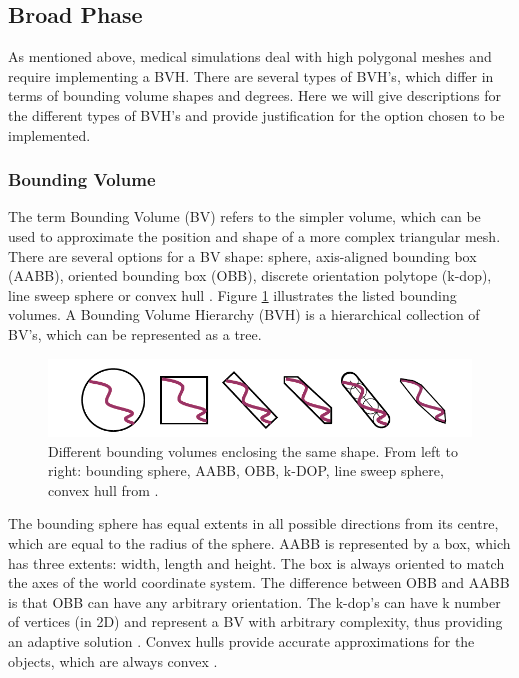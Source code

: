   \subsection{Broad Phase}
  As mentioned above, medical simulations deal with high polygonal meshes and require implementing a BVH. There are several types of BVH's, which differ in terms of bounding volume shapes and degrees. Here we will give descriptions for the different types of BVH's and provide justification for the option chosen to be implemented.

    \subsubsection{Bounding Volume}
    The term Bounding Volume (BV) refers to the simpler volume, which can be used to approximate the position and shape of a more complex triangular mesh. There are several options for a BV shape: sphere, axis-aligned bounding box (AABB), oriented bounding box (OBB), discrete orientation polytope (k-dop), line sweep sphere or convex hull \citep{BVs}. Figure \ref{BVs} illustrates the listed bounding volumes. A Bounding Volume Hierarchy (BVH) is a hierarchical collection of BV's, which can be represented as a tree.

          \begin{figure}
            \centering
              \includegraphics[width=120mm]{sections/methodology/images/contact/BVs.png}
            \caption[Different bounding volumes enclosing the same shape.]{\label{BVs} Different bounding volumes enclosing the same shape. From left to right: bounding sphere, AABB, OBB, k-DOP, line sweep sphere, convex hull from \citep{BVs}.}
          \end{figure}

    The bounding sphere has equal extents in all possible directions from its centre, which are equal to the radius of the sphere. AABB is represented by a box, which has three extents: width, length and height. The box is always oriented to match the axes of the world coordinate system. The difference between OBB and AABB is that OBB can have any arbitrary orientation. The k-dop's can have k number of vertices (in 2D) and represent a BV with arbitrary complexity, thus providing an adaptive solution \citep{realTimeColDet}. Convex hulls provide accurate approximations for the objects, which are always convex \citep{convexhulls}.


